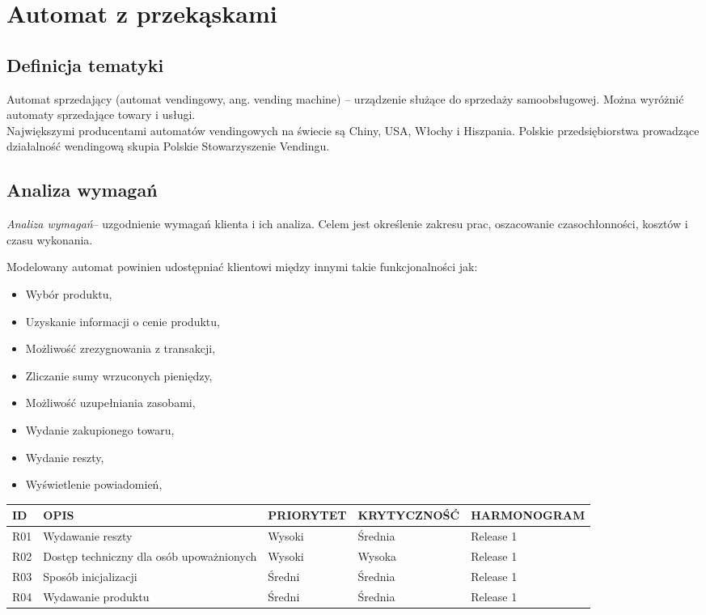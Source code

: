 \documentclass[a4paper, 11pt]{article}
\begin{document}
\section{Automat z przekąskami }

\subsection{Definicja tematyki}
 Automat sprzedający (automat vendingowy, ang. vending machine) – urządzenie służące do sprzedaży samoobsługowej. Można wyróżnić automaty sprzedające towary i usługi.\\
 Największymi producentami automatów vendingowych na świecie są Chiny, USA, Włochy i Hiszpania.
 Polskie przedsiębiorstwa prowadzące działalność wendingową skupia Polskie Stowarzyszenie Vendingu.

\subsection{Analiza wymagań}
\emph{Analiza wymagań}– uzgodnienie wymagań klienta i ich analiza. Celem jest określenie zakresu prac, oszacowanie czasochłonności, kosztów i czasu wykonania.

Modelowany automat powinien udostępniać klientowi między innymi takie funkcjonalności jak:
\begin{itemize}

\item Wybór produktu,
\item Uzyskanie informacji o cenie produktu,
\item Możliwość zrezygnowania z transakcji,
\item Zliczanie sumy wrzuconych pieniędzy,
\item Możliwość uzupełniania zasobami,
\item Wydanie zakupionego towaru,
\item Wydanie reszty,
\item Wyświetlenie powiadomień,

\end{itemize}

\vspace{2cm}

\begin{tabular}{|l|p{3.5cm}|l|l|l|} \hline
ID  & OPIS & PRIORYTET & KRYTYCZNOŚĆ & HARMONOGRAM \\ \hline
R01 & Wydawanie reszty & Wysoki & Średnia & Release 1\\ \hline
R02 & Dostęp techniczny dla osób upoważnionych & Wysoki & Wysoka & Release 1 \\ \hline
R03 & Sposób inicjalizacji & Średni & Średnia & Release 1\\ \hline
R04 & Wydawanie produktu & Średni & Średnia & Release 1 \\ \hline
\end{tabular}\\
\end{document}
